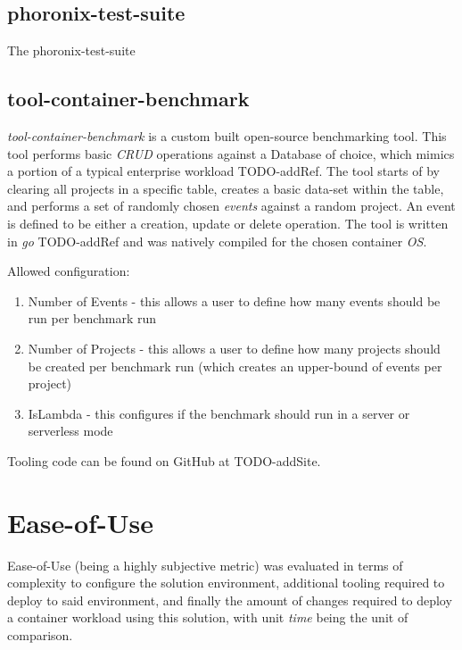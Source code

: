 \subsection{phoronix-test-suite}
The phoronix-test-suite

\subsection{tool-container-benchmark}
\textit{tool-container-benchmark} is a custom built open-source benchmarking tool. This tool performs basic \emph{CRUD} operations against a Database of choice,
which mimics a portion of a typical enterprise workload TODO-addRef. The tool starts of by clearing all projects in a specific table, creates a basic data-set within the table,
and performs a set of randomly chosen \textit{events} against a random project. An event is defined to be either a creation, update or delete operation.
The tool is written in \emph{go} TODO-addRef and was natively compiled for the chosen container \emph{OS}.

Allowed configuration:
\begin{enumerate}
  \item Number of Events - this allows a user to define how many events should be run per benchmark run
  \item Number of Projects - this allows a user to define how many projects should be created per benchmark run (which creates an upper-bound of events per project)
  \item IsLambda - this configures if the benchmark should run in a server or serverless mode
\end{enumerate}

Tooling code can be found on GitHub at TODO-addSite.

\section{Ease-of-Use}
Ease-of-Use (being a highly subjective metric) was evaluated in terms of complexity to configure the solution environment, additional tooling required to deploy to said environment,
and finally the amount of changes required to deploy a container workload using this solution, with unit \textit{time} being the unit of comparison.
